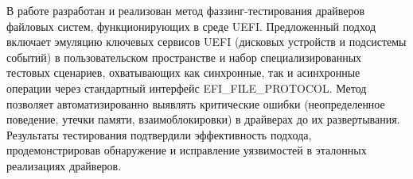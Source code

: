 \documentclass{HSECourseW}
\begin{document}
	
\titlepage

\begin{abstractpage}
	В работе разработан и реализован метод фаззинг-тестирования драйверов файловых систем, функционирующих в среде UEFI. Предложенный подход включает эмуляцию ключевых сервисов UEFI (дисковых устройств и подсистемы событий) в пользовательском пространстве и набор специализированных тестовых сценариев, охватывающих как синхронные, так и асинхронные операции через стандартный интерфейс EFI\_FILE\_PROTOCOL. Метод позволяет автоматизированно выявлять критические ошибки (неопределенное поведение, утечки памяти, взаимоблокировки) в драйверах до их развертывания. Результаты тестирования подтвердили эффективность подхода, продемонстрировав обнаружение и исправление уязвимостей в эталонных реализациях драйверов.
	
\end{abstractpage}

\tableofcontents











\end{document}
